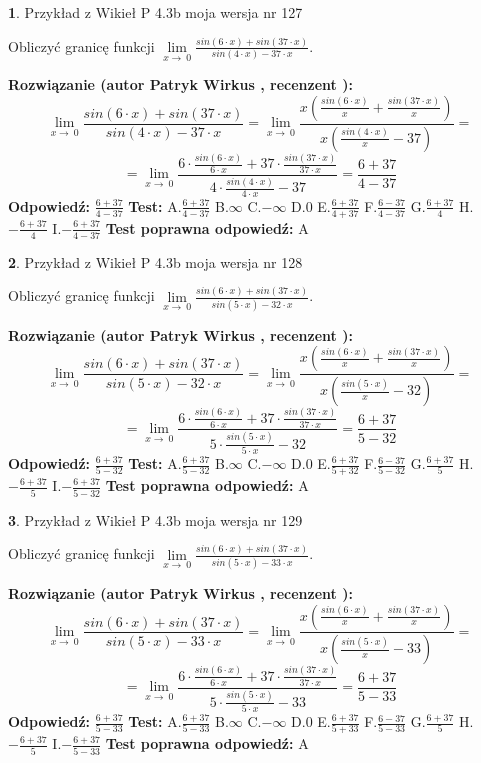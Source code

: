 \documentclass[12pt, a4paper]{article}
\theoremstyle{definition} %
\newtheorem{zad}{}
\newcommand{\zadStart}[1]{\begin{zad}#1\newline}
\newcommand{\zadStop}{\end{zad}}
\newcommand{\rozwStart}[2]{\noindent \textbf{Rozwiązanie (autor #1 , recenzent #2): }\newline}
\newcommand{\rozwStop}{\newline}
\newcommand{\odpStart}{\noindent \textbf{Odpowiedź:}\newline}
\newcommand{\odpStop}{\newline}
\newcommand{\testStart}{\noindent \textbf{Test:}\newline}
\newcommand{\testStop}{\newline}
\newcommand{\kluczStart}{\noindent \textbf{Test poprawna odpowiedź:}\newline}
\newcommand{\kluczStop}{\newline}
\begin{document}
\zadStart{Przykład z Wikieł P 4.3b moja wersja nr 127}


Obliczyć granicę funkcji $\lim\limits_{x\to\ 0}\frac{sin(6 \cdot x)+sin(37 \cdot x)}{sin(4 \cdot x)-37 \cdot x}$.
\zadStop
\rozwStart{Patryk Wirkus}{}
$$\lim\limits_{x\to\ 0}\frac{sin(6 \cdot x)+sin(37 \cdot x)}{sin(4 \cdot x)-37 \cdot x}=\lim\limits_{x\to\ 0}\frac{x(\frac{sin(6 \cdot x)}{x}+\frac{sin(37 \cdot x)}{x})}{x(\frac{sin(4 \cdot x)}{x}-37)}=$$
$$=\lim\limits_{x\to\ 0}\frac{6 \cdot \frac{sin(6 \cdot x)}{6 \cdot x}+37 \cdot \frac{sin(37 \cdot x)}{37 \cdot x}}{4 \cdot \frac{sin(4 \cdot x)}{4 \cdot x}-37}=\frac{6+37}{4-37}$$
\rozwStop
\odpStart
$\frac{6+37}{4-37}$
\odpStop
\testStart
A.$\frac{6+37}{4-37}$
B.$\infty$
C.$-\infty$
D.$0$
E.$\frac{6+37}{4+37}$
F.$\frac{6-37}{4-37}$
G.$\frac{6+37}{4}$
H.$-\frac{6+37}{4}$
I.$-\frac{6+37}{4-37}$
\testStop
\kluczStart
A
\kluczStop



\zadStart{Przykład z Wikieł P 4.3b moja wersja nr 128}


Obliczyć granicę funkcji $\lim\limits_{x\to\ 0}\frac{sin(6 \cdot x)+sin(37 \cdot x)}{sin(5 \cdot x)-32 \cdot x}$.
\zadStop
\rozwStart{Patryk Wirkus}{}
$$\lim\limits_{x\to\ 0}\frac{sin(6 \cdot x)+sin(37 \cdot x)}{sin(5 \cdot x)-32 \cdot x}=\lim\limits_{x\to\ 0}\frac{x(\frac{sin(6 \cdot x)}{x}+\frac{sin(37 \cdot x)}{x})}{x(\frac{sin(5 \cdot x)}{x}-32)}=$$
$$=\lim\limits_{x\to\ 0}\frac{6 \cdot \frac{sin(6 \cdot x)}{6 \cdot x}+37 \cdot \frac{sin(37 \cdot x)}{37 \cdot x}}{5 \cdot \frac{sin(5 \cdot x)}{5 \cdot x}-32}=\frac{6+37}{5-32}$$
\rozwStop
\odpStart
$\frac{6+37}{5-32}$
\odpStop
\testStart
A.$\frac{6+37}{5-32}$
B.$\infty$
C.$-\infty$
D.$0$
E.$\frac{6+37}{5+32}$
F.$\frac{6-37}{5-32}$
G.$\frac{6+37}{5}$
H.$-\frac{6+37}{5}$
I.$-\frac{6+37}{5-32}$
\testStop
\kluczStart
A
\kluczStop



\zadStart{Przykład z Wikieł P 4.3b moja wersja nr 129}


Obliczyć granicę funkcji $\lim\limits_{x\to\ 0}\frac{sin(6 \cdot x)+sin(37 \cdot x)}{sin(5 \cdot x)-33 \cdot x}$.
\zadStop
\rozwStart{Patryk Wirkus}{}
$$\lim\limits_{x\to\ 0}\frac{sin(6 \cdot x)+sin(37 \cdot x)}{sin(5 \cdot x)-33 \cdot x}=\lim\limits_{x\to\ 0}\frac{x(\frac{sin(6 \cdot x)}{x}+\frac{sin(37 \cdot x)}{x})}{x(\frac{sin(5 \cdot x)}{x}-33)}=$$
$$=\lim\limits_{x\to\ 0}\frac{6 \cdot \frac{sin(6 \cdot x)}{6 \cdot x}+37 \cdot \frac{sin(37 \cdot x)}{37 \cdot x}}{5 \cdot \frac{sin(5 \cdot x)}{5 \cdot x}-33}=\frac{6+37}{5-33}$$
\rozwStop
\odpStart
$\frac{6+37}{5-33}$
\odpStop
\testStart
A.$\frac{6+37}{5-33}$
B.$\infty$
C.$-\infty$
D.$0$
E.$\frac{6+37}{5+33}$
F.$\frac{6-37}{5-33}$
G.$\frac{6+37}{5}$
H.$-\frac{6+37}{5}$
I.$-\frac{6+37}{5-33}$
\testStop
\kluczStart
A
\kluczStop
\end{document}
